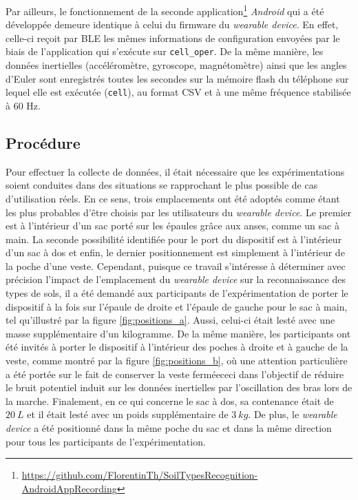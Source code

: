 Par ailleurs, le fonctionnement de la seconde application\footnote{\url{https://github.com/FlorentinTh/SoilTypesRecognition-AndroidAppRecording}} \textit{Android} qui a été développée demeure identique à celui du firmware du \textit{wearable device}. En effet, celle-ci reçoit par \acs{BLE} les mêmes informations de configuration envoyées par le biais de l'application qui s'exécute sur \texttt{cell\_oper}. De la même manière, les données inertielles (accéléromètre, gyroscope, magnétomètre) ainsi que les angles d'Euler sont enregistrés toutes les secondes sur la mémoire flash du téléphone sur lequel elle est exécutée (\texttt{cell}), au format \acs{CSV} et à une même fréquence stabilisée à 60 Hz.

\subsection{Procédure}
Pour effectuer la collecte de données, il était nécessaire que les expérimentations soient conduites dans des situations se rapprochant le plus possible de cas d'utilisation réels. En ce sens, trois emplacements ont été adoptés comme étant les plus probables d'être choisis par les utilisateurs du \textit{wearable device}. Le premier est à l'intérieur d'un sac porté sur les épaules grâce aux anses, comme un sac à main. La seconde possibilité identifiée pour le port du dispositif est à l'intérieur d'un sac à dos et enfin, le dernier positionnement est simplement à l'intérieur de la poche d'une veste. Cependant, puisque ce travail s'intéresse à déterminer avec précision l'impact de l'emplacement du \textit{wearable device} sur la reconnaissance des types de sols, il a été demandé aux participants de l'expérimentation de porter le dispositif à la fois sur l'épaule de droite et l'épaule de gauche pour le sac à main, tel qu'illustré par la figure \ref{fig:positions_a}. Aussi, celui-ci était lesté avec une masse supplémentaire d'un kilogramme. De la même manière, les participants ont été invités à porter le dispositif à l'intérieur des poches à droite et à gauche de la veste, comme montré par la figure \ref{fig:positions_b}, où une attention particulière a été portée sur le fait de conserver la veste fermée\textemdash ceci dans l'objectif de réduire le bruit potentiel induit sur les données inertielles par l'oscillation des bras lors de la marche. Finalement, en ce qui concerne le sac à dos, sa contenance était de $20\:L$ et il était lesté avec un poids supplémentaire de $3\:kg$. De plus, le \textit{wearable device} a été positionné dans la même poche du sac et dans la même direction pour tous les participants de l'expérimentation.

